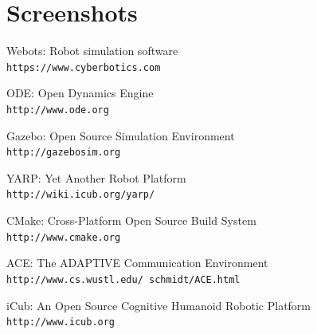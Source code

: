 \documentclass[a4paper, 11pt]{report}
\begin{document}
\chapter{Screenshots}
  
  \begin{thebibliography}{9}
    Webots: Robot simulation software
    \\\texttt{https://www.cyberbotics.com}
    
    ODE: Open Dynamics Engine
    \\\texttt{http://www.ode.org}
  
    Gazebo: Open Source Simulation Environment
    \\\texttt{http://gazebosim.org}
    
    YARP: Yet Another Robot Platform 
    \\\texttt{http://wiki.icub.org/yarp/}
    
    CMake: Cross-Platform Open Source Build System 
    \\\texttt{http://www.cmake.org}
    
    ACE: The ADAPTIVE Communication Environment
    \\\texttt{http://www.cs.wustl.edu/~schmidt/ACE.html}
    
    iCub: An Open Source Cognitive Humanoid Robotic Platform
    \\\texttt{http://www.icub.org}
    
  \end{thebibliography}
  
\end{document}
